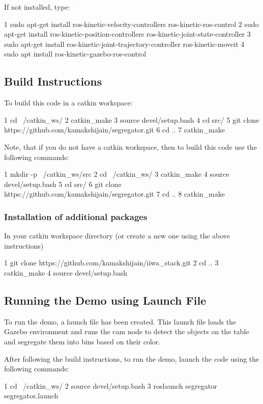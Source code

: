 If not installed, type\+:


\begin{DoxyCode}
1 sudo apt-get install ros-kinetic-velocity-controllers ros-kinetic-ros-control
2 sudo apt-get install ros-kinetic-position-controllers ros-kinetic-joint-state-controller
3 sudo apt-get install ros-kinetic-joint-trajectory-controller ros-kinetic-moveit
4 sudo apt install ros-kinetic-gazebo-ros-control
\end{DoxyCode}


\subsection*{Build Instructions}

To build this code in a catkin workspace\+: 
\begin{DoxyCode}
1 cd ~/catkin\_ws/
2 catkin\_make
3 source devel/setup.bash
4 cd src/
5 git clone https://github.com/kamakshijain/segregator.git
6 cd ..
7 catkin\_make
\end{DoxyCode}
 Note, that if you do not have a catkin workspace, then to build this code use the following commands\+: 
\begin{DoxyCode}
1 mkdir -p ~/catkin\_ws/src
2 cd ~/catkin\_ws/
3 catkin\_make
4 source devel/setup.bash
5 cd src/
6 git clone https://github.com/kamakshijain/segregator.git
7 cd ..
8 catkin\_make
\end{DoxyCode}
 \subsubsection*{Installation of additional packages}

In your catkin workspace directory (or create a new one using the above instructions) 
\begin{DoxyCode}
1 git clone https://github.com/kamakshijain/iiwa\_stack.git
2 cd ..
3 catkin\_make
4 source devel/setup.bash
\end{DoxyCode}
 \subsection*{Running the Demo using Launch File}

To run the demo, a launch file has been created. This launch file loads the Gazebo environment and runs the cam node to detect the objects on the table and segregate them into bins based on their color.

After following the build instructions, to run the demo, launch the code using the following commands\+: 
\begin{DoxyCode}
1 cd ~/catkin\_ws/
2 source devel/setup.bash
3 roslaunch segregator segregator.launch
\end{DoxyCode}


